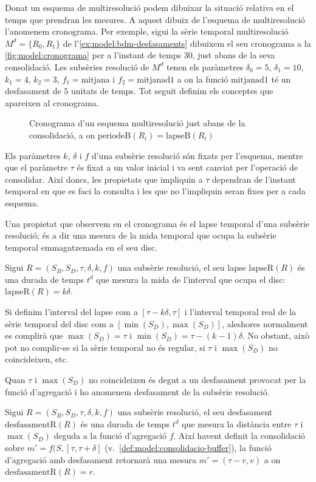 Donat un esquema de multiresolució podem dibuixar la situació relativa
en el temps que prendran les mesures. A aquest dibuix de l'esquema de
multiresolució l'anomenem cronograma. Per exemple, sigui la sèrie
temporal multiresolució $M^d=\{R_0,R_1\}$ de
l'\autoref{ex:model:bdm-desfasaments} dibuixem el seu cronograma a la
\autoref{fig:model:cronograma} per a l'instant de temps $30$, just
abans de la seva consolidació. Les subsèries resolució de $M^d$ tenen
els paràmetres $\delta_0=5$, $\delta_1=10$, $k_1=4$, $k_2=3$,
$f_1=\text{mitjana}$ i $f_2=\text{mitjanad1}$ a on la funció
$\text{mitjanad1}$ té un desfasament de $5$ unitats de temps. Tot
seguit definim els conceptes que apareixen al cronograma.

\begin{figure}[tp]
  \centering
  
  \caption{Cronograma d'un esquema multiresolució just abans de la consolidació, a on $\text{periodeB}(R_i)=\text{lapseB}(R_i)$}
  \label{fig:model:cronograma}
\end{figure}


Els paràmetres $k$, $\delta$ i $f$ d'una subsèrie resolució són fixats
per l'esquema, mentre que el paràmetre $\tau$ és fixat a un valor
inicial i va sent canviat per l'operació de consolidar. Així doncs,
les propietats que impliquin a $\tau$ dependran de l'instant temporal
en que es faci la consulta i les que no l'impliquin seran fixes per a
cada esquema.

Una propietat que observem en el cronograma és el lapse temporal d'una
subsèrie resolució; és a dir una mesura de la mida temporal que ocupa
la subsèrie temporal emmagatzemada en el seu disc.
\begin{definition} %
  Sigui $R=(S_B,S_D,\tau,\delta,k,f)$ una subsèrie resolució, el seu
  lapse $\text{lapseR}(R)$ és una durada de temps $t^d$ que mesura la
  mida de l'interval que ocupa el disc: $\text{lapseR}(R) = k\delta$.
\end{definition}


Si definim l'interval del lapse com a $[\tau - k\delta, \tau]$
i l'interval temporal real de la sèrie temporal del disc com a
$[\min(S_D),\max(S_D)]$, aleshores normalment es complirà que
$\max(S_D)=\tau$ i $\min(S_D)=\tau - (k-1)\delta$. No obstant, això
pot no complir-se si la sèrie temporal no és regular, si $\tau$ i
$\max(S_D)$ no coincideixen, etc. 

Quan $\tau$ i $\max(S_D)$ no coincideixen és degut a un desfasament
provocat per la funció d'agregació i ho anomenem desfasament de la
subsèrie resolució.
\begin{definition} %
  Sigui $R=(S_B,S_D,\tau,\delta,k,f)$ una subsèrie resolució, el seu
  desfasament $\text{desfasamentR}(R)$ és una durada de temps $t^d$
  que mesura la distància entre $\tau$ i $\max(S_D)$ deguda a la
  funció d'agregació $f$. Així havent definit la consolidació sobre
  $m'=f(S,[\tau,\tau+\delta]$
  (v.~\autoref{def:model:consolidacio-buffer}), la funció d'agregació
  amb desfasament retornarà una mesura $m'=(\tau - r,v)$ a on
  $\text{desfasamentR}(R) = r$.
\end{definition}


